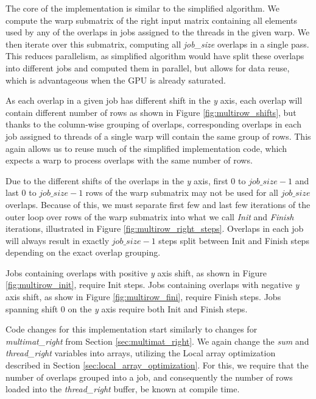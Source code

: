 The core of the implementation is similar to the simplified algorithm. We compute the warp submatrix of the right input matrix containing all elements used by any of the overlaps in jobs assigned to the threads in the given warp. We then iterate over this submatrix, computing all \textit{job\_size} overlaps in a single pass. This reduces parallelism, as simplified algorithm would have split these overlaps into different jobs and computed them in parallel, but allows for data reuse, which is advantageous when the GPU is already saturated.

As each overlap in a given job has different shift in the \textit{y} axis, each overlap will contain different number of rows as shown in Figure \ref{fig:multirow_shifts}, but thanks to the column-wise grouping of overlaps, corresponding overlaps in each job assigned to threads of a single warp will contain the same group of rows. This again allows us to reuse much of the simplified implementation code, which expects a warp to process overlaps with the same number of rows.

Due to the different shifts of the overlaps in the \textit{y} axis, first $0$ to $job\_size - 1$ and last $0$ to $job\_size - 1$ rows of the warp submatrix may not be used for all $job\_size$ overlaps. Because of this, we must separate first few and last few iterations of the outer loop over rows of the warp submatrix into what we call \textit{Init} and \textit{Finish} iterations, illustrated in Figure \ref{fig:multirow_right_steps}. Overlaps in each job will always result in exactly $job\_size - 1$ steps split between Init and Finish steps depending on the exact overlap grouping.

Jobs containing overlaps with positive \textit{y} axis shift, as shown in Figure \ref{fig:multirow_init}, require Init steps. Jobs containing overlaps with negative \textit{y} axis shift, as show in Figure \ref{fig:multirow_fini}, require Finish steps. Jobs spanning shift $0$ on the \textit{y} axis require both Init and Finish steps.


Code changes for this implementation start similarly to changes for \textit{multimat\_right} from Section \ref{sec:multimat_right}. We again change the \textit{sum} and \textit{thread\_right} variables into arrays, utilizing the Local array optimization described in Section \ref{sec:local_array_optimization}. For this, we require that the number of overlaps grouped into a job, and consequently the number of rows loaded into the \textit{thread\_right} buffer, be known at compile time.



